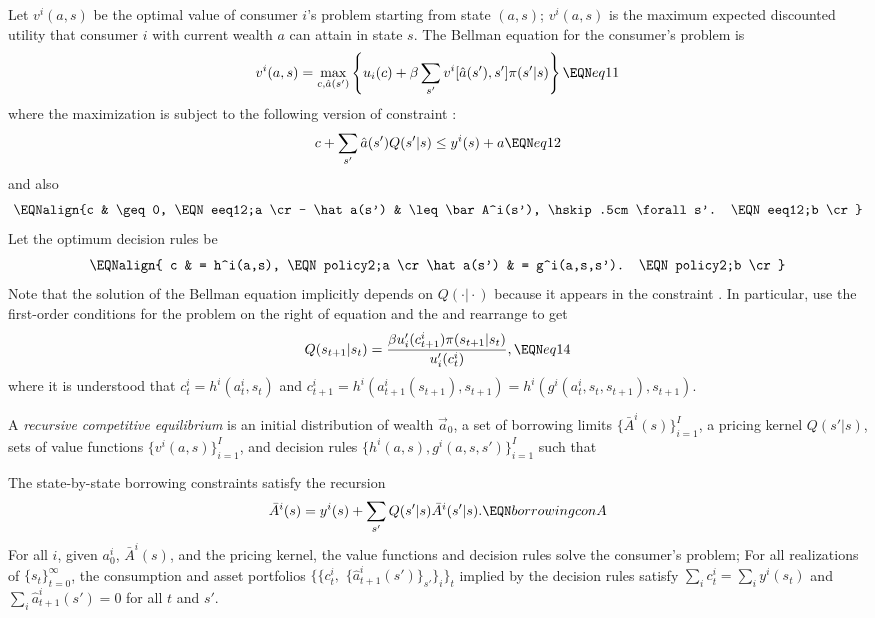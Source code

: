 Let $v^i(a,s)$ be the optimal value of consumer $i$'s problem
starting from state $(a, s)$;     $v^i(a,s)$ is the maximum
expected discounted utility  that consumer $i$ with current wealth $a$
can attain in state $s$.
The Bellman equation for the consumer's problem is
$$ v^i(a, s) = \max_{c, \hat a(s')} \left\{ u_i(c) + \beta
\sum_{s'} v^i[\hat a(s'),s'] \pi (s' | s) \right\} \EQN eq11 $$
where the maximization is subject to the following version
of constraint :
$$ c + \sum_{s'} \hat a(s') Q(s' | s)
     \leq  y^i(s) + a  \EQN eq12   $$
and also
$$\EQNalign{c & \geq 0, \EQN eeq12;a \cr
           -   \hat a(s') & \leq \bar A^i(s'), \hskip.5cm \forall s'.   \EQN eeq12;b \cr}$$
Let the optimum decision rules be
$$\EQNalign{ c & =  h^i(a,s), \EQN policy2;a \cr
            \hat a(s') & = g^i(a,s,s').  \EQN policy2;b \cr}$$
Note that the solution of the Bellman equation implicitly depends
on $Q(\cdot \vert \cdot)$ because it appears in the constraint
. In particular, use the first-order conditions for  the
problem on the right of equation  and the
 and rearrange to get
$$ Q(s_{t+1} | s_t ) = {\beta u'_i(c_{t+1}^i) \pi(s_{t+1} | s_t)
                 \over u'_i(c_t^i) }, \EQN eq14 $$
where it is understood that $c_t^i = h^i(a_t^i,s_t)$
and
$c_{t+1}^i = h^i(a_{t+1}^i(s_{t+1}), s_{t+1})
= h^i(g^i(a_t^i,s_t,s_{t+1}), s_{t+1})$.












\medskip{} A {\it  recursive competitive equilibrium} is
an initial distribution of wealth $\vec a_0$, a set of borrowing limits $\{\bar A^i(s)\}_{i=1}^I$,
a pricing kernel $Q(s' | s)$, sets of value functions $\{v^i(a,s)\}_{i=1}^I$, and
decision rules $\{h^i(a,s), g^i(a,s,s')\}_{i=1}^I$ such
that

 The state-by-state borrowing constraints satisfy the recursion
$$ \bar A^i(s) = y^i(s) + \sum_{s'} Q(s'|s) \bar A^i(s'|s).  \EQN borrowingconA $$
\medskip
{} For all $i$, given
 $a^i_0$, $\bar A^i(s)$,  and the pricing kernel, the value functions and decision rules
solve the consumer's problem;
\medskip
{} For all realizations of $\{s_t\}_{t=0}^\infty$, the consumption and asset
portfolios $\{\{c^i_t,$
$\{\hat a^i_{t+1}(s')\}_{s'}\}_i\}_t$ implied by the
decision rules satisfy $\sum_i c^i_t = \sum_i y^i(s_t)$ and
$\sum_i \hat a_{t+1}^i(s') = 0$
for all $t$ and $s'$.
\medskip
\noindent {}


